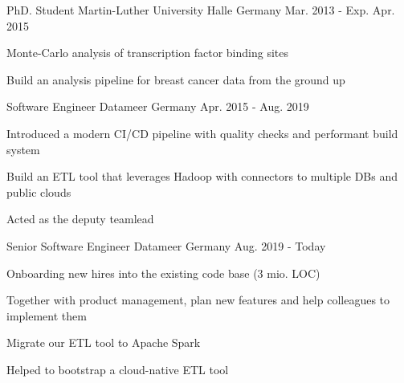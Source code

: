 


\begin{cventries}


\cventry
{PhD. Student} %
{Martin-Luther University Halle} %
{Germany} %
{Mar. 2013 - Exp. Apr. 2015} %
{ %
\begin{cvitems}
\item {Monte-Carlo analysis of transcription factor binding sites}
\item {Build an analysis pipeline for breast cancer data from the ground up}
\end{cvitems}
}

\cventry
{Software Engineer} %
{Datameer} %
{Germany} %
{Apr. 2015 - Aug. 2019} %
{ %
\begin{cvitems}
\item {Introduced a modern CI/CD pipeline with quality checks and performant build system}
\item {Build an ETL tool that leverages Hadoop with connectors to multiple DBs and public clouds}
\item {Acted as the deputy teamlead}
\end{cvitems}
}


\cventry
{Senior Software Engineer} %
{Datameer} %
{Germany} %
{Aug. 2019 - Today} %
{ %
\begin{cvitems}
\item {Onboarding new hires into the existing code base (3 mio. LOC)}
\item {Together with product management, plan new features and help colleagues to implement them}
\item {Migrate our ETL tool to Apache Spark}
\item {Helped to bootstrap a cloud-native ETL tool}
\end{cvitems}
}

\end{cventries}

